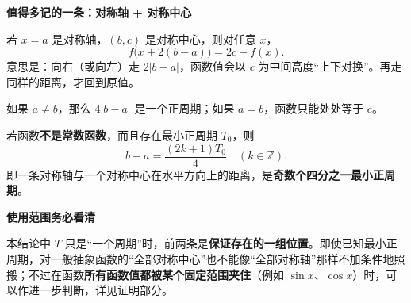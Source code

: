 \begin{statementbox}
\medskip
\end{statementbox}\clearpage\begin{statementbox}

\textbf{\textcolor{CStatement}{值得多记的一条：对称轴 + 对称中心}} 

若 $x=a$ 是对称轴，$(b,c)$ 是对称中心，则对任意 $x$，
\[
\boxed{f\bigl(x+2(b-a)\bigr)=2c-f(x).}
\]
意思是：向右（或向左）走 $2|b-a|$，函数值会以 $c$ 为中间高度“上下对换”。再走同样的距离，才回到原值。

如果 $a\ne b$，那么 $4|b-a|$ 是一个正周期；如果 $a=b$，函数只能处处等于 $c$。

若函数\textbf{不是常数函数}，而且存在最小正周期 $T_0$，则
\[
\boxed{b-a=\frac{(2k+1)T_0}{4}\quad(k\in\mathbb Z).}
\]
即一条对称轴与一个对称中心在水平方向上的距离，是\textbf{奇数个四分之一最小正周期}。

\medskip
\textbf{\textcolor{CStatement}{使用范围务必看清}}

本结论中 $T$ 只是“一个周期”时，前两条是\textbf{保证存在的一组位置}。即使已知最小正周期，对一般抽象函数的“全部对称中心”也不能像“全部对称轴”那样不加条件地照搬；不过在函数\textbf{所有函数值都被某个固定范围夹住}（例如 $\sin x$、$\cos x$）时，可以作进一步判断，详见证明部分。
\end{statementbox}
